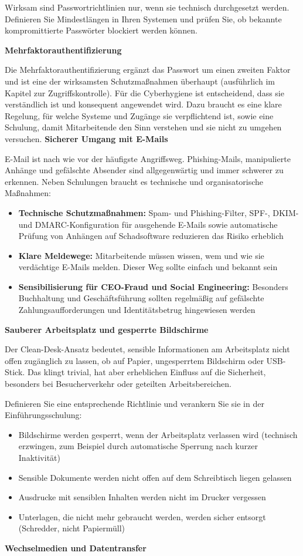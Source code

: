 Wirksam sind Passwortrichtlinien nur, wenn sie technisch durchgesetzt werden. Definieren Sie Mindestlängen in Ihren Systemen und prüfen Sie, ob bekannte kompromittierte Passwörter blockiert werden können.

\textbf{Mehrfaktorauthentifizierung}

Die Mehrfaktorauthentifizierung ergänzt das Passwort um einen zweiten Faktor und ist eine der wirksamsten Schutzmaßnahmen überhaupt (ausführlich im Kapitel zur Zugriffskontrolle). Für die Cyberhygiene ist entscheidend, dass sie verständlich ist und konsequent angewendet wird. Dazu braucht es eine klare Regelung, für welche Systeme und Zugänge sie verpflichtend ist, sowie eine Schulung, damit Mitarbeitende den Sinn verstehen und sie nicht zu umgehen versuchen.
\newpage
\textbf{Sicherer Umgang mit E-Mails}

E-Mail ist nach wie vor der häufigste Angriffsweg. Phishing-Mails, manipulierte Anhänge und gefälschte Absender sind allgegenwärtig und immer schwerer zu erkennen. Neben Schulungen braucht es technische und organisatorische Maßnahmen:

\begin{itemize}
    \item \textbf{Technische Schutzmaßnahmen:} Spam- und Phishing-Filter, SPF-, DKIM- und DMARC-Konfiguration für ausgehende E-Mails sowie automatische Prüfung von Anhängen auf Schadsoftware reduzieren das Risiko erheblich
    \item \textbf{Klare Meldewege:} Mitarbeitende müssen wissen, wem und wie sie verdächtige E-Mails melden. Dieser Weg sollte einfach und bekannt sein
    \item \textbf{Sensibilisierung für CEO-Fraud und Social Engineering:} Besonders Buchhaltung und Geschäftsführung sollten regelmäßig auf gefälschte Zahlungsaufforderungen und Identitätsbetrug hingewiesen werden
\end{itemize}

\textbf{Sauberer Arbeitsplatz und gesperrte Bildschirme}

Der Clean-Desk-Ansatz bedeutet, sensible Informationen am Arbeitsplatz nicht offen zugänglich zu lassen, ob auf Papier, ungesperrtem Bildschirm oder USB-Stick. Das klingt trivial, hat aber erheblichen Einfluss auf die Sicherheit, besonders bei Besucherverkehr oder geteilten Arbeitsbereichen.

Definieren Sie eine entsprechende Richtlinie und verankern Sie sie in der Einführungsschulung:

\begin{itemize}
    \item Bildschirme werden gesperrt, wenn der Arbeitsplatz verlassen wird (technisch erzwingen, zum Beispiel durch automatische Sperrung nach kurzer Inaktivität)
    \item Sensible Dokumente werden nicht offen auf dem Schreibtisch liegen gelassen
    \item Ausdrucke mit sensiblen Inhalten werden nicht im Drucker vergessen
    \item Unterlagen, die nicht mehr gebraucht werden, werden sicher entsorgt (Schredder, nicht Papiermüll)
\end{itemize}
\newpage
\textbf{Wechselmedien und Datentransfer}


